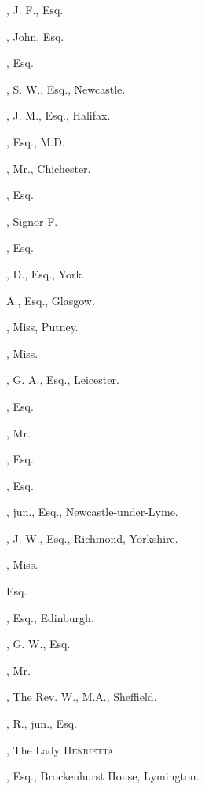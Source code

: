 \begin{multicols}{2}\small
\setlength{\parindent}{0em}
\setlength{\parskip}{0em}
\raggedright
\raggedcolumns

, J. F., Esq.

, John, Esq.

, Esq.

, S. W., Esq., Newcastle.

, J. M., Esq., Halifax.

, Esq., M.D.

, Mr., Chichester.

, Esq.
\bigskip

, Signor F.

, Esq.

, D., Esq., York.

 A., Esq., Glasgow.

, Miss, Putney.

, Miss.

, G. A., Esq., Leicester.

, Esq.

, Mr.

, Esq.
\bigskip

, Esq.

, jun., Esq., Newcastle-under-Lyme.

, J. W., Esq., Richmond, Yorkshire.

, Miss.

 Esq.

, Esq., Edinburgh.

, G. W., Esq.

, Mr.

, The Rev. W., M.A., Sheffield.

, R., jun., Esq.

, The Lady \textsc{Henrietta}.

, Esq., Brockenhurst House,
Lymington.


\end{multicols}
